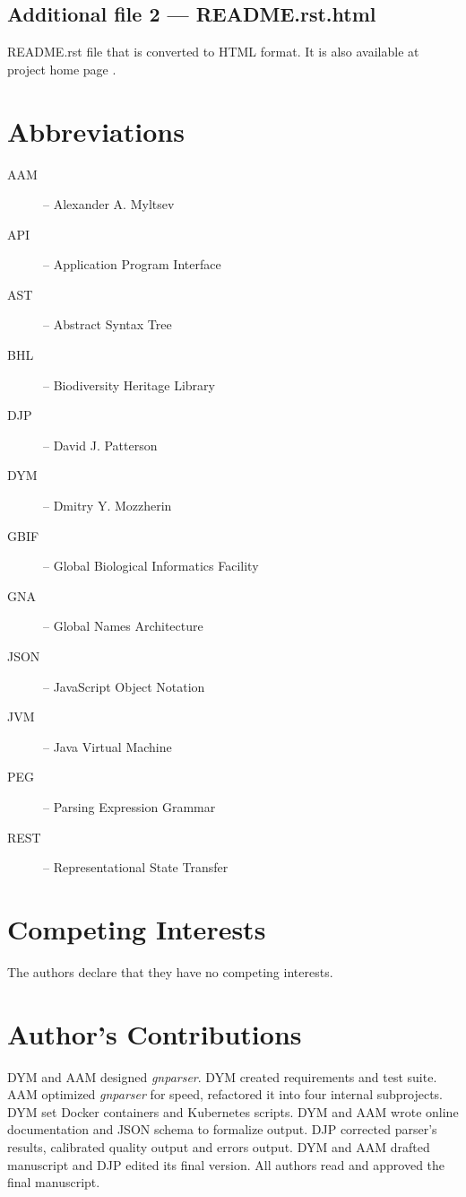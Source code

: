 \documentclass{bmcart}
\begin{document}
  \subsection*{Additional file 2 --- README.rst.html}
  README.rst file that is converted to HTML format. It is also available at
  project home page \cite{gnparser}.

\section*{Abbreviations}

\begin{description}
  \item[AAM] -- Alexander A. Myltsev
  \item[API] -- Application Program Interface
  \item[AST] -- Abstract Syntax Tree
  \item[BHL] -- Biodiversity Heritage Library
  \item[DJP] -- David J. Patterson
  \item[DYM] -- Dmitry Y. Mozzherin
  \item[GBIF] -- Global Biological Informatics Facility
  \item[GNA] -- Global Names Architecture
  \item[JSON] -- JavaScript Object Notation
  \item[JVM] -- Java Virtual Machine
  \item[PEG] -- Parsing Expression Grammar
  \item[REST] -- Representational State Transfer
\end{description}

\section*{Competing Interests}

The authors declare that they have no competing interests.

\section*{Author's Contributions}

DYM and AAM designed \textit{gnparser}. DYM created requirements and test
suite. AAM optimized \textit{gnparser} for speed, refactored it into four
internal subprojects.  DYM set Docker containers and Kubernetes scripts. DYM
and AAM wrote online documentation and JSON schema to formalize output. DJP
corrected parser's results, calibrated quality output and errors output. DYM
and AAM drafted manuscript and DJP edited its final version. All authors read
and approved the final manuscript.
\end{document}
